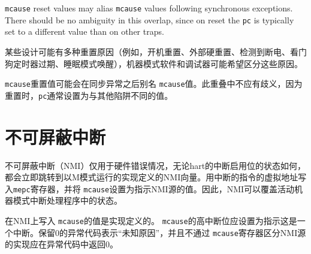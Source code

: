 {\begin{commentary}
{\tt mcause} reset values may alias {\tt mcause} values following synchronous
exceptions.  There should be no ambiguity in this overlap, since on reset the
{\tt pc} is typically set to a different value than on other traps.
\end{commentary}
\fi
\begin{commentary}
某些设计可能有多种重置原因（例如，开机重置、外部硬重置、检测到断电、看门狗定时器过期、睡眠模式唤醒），机器模式软件和调试器可能希望区分这些原因。

{\tt mcause}重置值可能会在同步异常之后别名 {\tt mcause}值。此重叠中不应有歧义，因为重置时，{\tt pc}通常设置为与其他陷阱不同的值。
\end{commentary}

\section{不可屏蔽中断}
\label{sec:nmi}

\iffalse
Non-maskable interrupts (NMIs) are only used for hardware error
conditions, and cause an immediate jump to an implementation-defined
NMI vector running in M-mode regardless of the state of a hart's
interrupt enable bits.  The {\tt mepc} register is written with the
virtual address of the instruction that was interrupted,
and {\tt mcause} is set to a value indicating the source of the
NMI.  The NMI can thus overwrite state in an active machine-mode
interrupt handler.

The values written to {\tt mcause} on an NMI are
implementation-defined.  The high Interrupt bit of {\tt mcause} should
be set to indicate that this was an interrupt.  An Exception Code of 0
is reserved to mean ``unknown cause'' and implementations that do not
distinguish sources of NMIs via the {\tt mcause} register should
return 0 in the Exception Code.

Unlike resets, NMIs do not reset processor state, enabling diagnosis,
reporting, and possible containment of the hardware error.
\fi
不可屏蔽中断（NMI）仅用于硬件错误情况，无论hart的中断启用位的状态如何，都会立即跳转到以M模式运行的实现定义的NMI向量。用中断的指令的虚拟地址写入{\tt mepc}寄存器，并将 {\tt mcause}设置为指示NMI源的值。因此，NMI可以覆盖活动机器模式中断处理程序中的状态。

在NMI上写入 {\tt mcause}的值是实现定义的。 {\tt mcause}的高中断位应设置为指示这是一个中断。保留0的异常代码表示“未知原因”，并且不通过 {\tt mcause}寄存器区分NMI源的实现应在异常代码中返回0。

}
